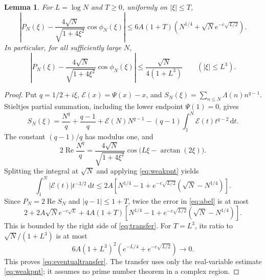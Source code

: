 \documentclass[11pt]{article}
\newtheorem{lemma}[theorem]{Lemma}
\theoremstyle{remark}
\newcommand{\dd}{\,\mathrm d}
\numberwithin{equation}{section}
\begin{document}
\begin{lemma}\label{lem:transfer}
For $L=\log N$ and $T\ge0$, uniformly on $|\xi|\le T$,
\begin{equation}\label{eq:transfer}
 \left|P_N(\xi)-\frac{4\sqrt N}{\sqrt{1+4\xi^2}}
                   \cos\phi_N(\xi)\right|
 \le6A(1+T)\left(N^{1/4}+\sqrt N e^{-c\sqrt{L/2}}\right).
\end{equation}
In particular, for all sufficiently large $N$,
\begin{equation}\label{eq:eventualtransfer}
 \left|P_N(\xi)-\frac{4\sqrt N}{\sqrt{1+4\xi^2}}
                   \cos\phi_N(\xi)\right|
 \le\frac{\sqrt N}{4(1+L^3)}\qquad(|\xi|\le L^3).
\end{equation}
\end{lemma}
\begin{proof}
Put $q=1/2+i\xi$, $\mathcal E(x)=\Psi(x)-x$, and
$S_N(\xi)=\sum_{n\le N}\Lambda(n)n^{q-1}$. Stieltjes partial summation, including the lower endpoint $\Psi(1)=0$, gives
\begin{equation}\label{eq:abel}
 S_N(\xi)=\frac{N^q}{q}+\frac{q-1}{q}
     +\mathcal E(N)N^{q-1}
     -(q-1)\int_1^N\mathcal E(t)t^{q-2}\dd t.
\end{equation}
The constant $(q-1)/q$ has modulus one, and
\[
 2\operatorname{Re}\frac{N^q}{q}
 =\frac{4\sqrt N}{\sqrt{1+4\xi^2}}
       \cos\bigl(L\xi-\arctan(2\xi)\bigr).
\]
Splitting the integral at $\sqrt N$ and applying \eqref{eq:weakpnt} yields
\begin{equation}\label{eq:integralbound}
 \int_1^N|\mathcal E(t)|t^{-3/2}\dd t
 \le2A\left[N^{1/4}-1+
      e^{-c\sqrt{L/2}}(\sqrt N-N^{1/4})\right].
\end{equation}
Since $P_N=2\operatorname{Re}S_N$ and $|q-1|\le1+T$, twice the error in \eqref{eq:abel} is at most
\[
 2+2A\sqrt N e^{-c\sqrt L}
 +4A(1+T)\left[N^{1/4}-1+
      e^{-c\sqrt{L/2}}(\sqrt N-N^{1/4})\right].
\]
This is bounded by the right side of \eqref{eq:transfer}. For $T=L^3$, its ratio to $\sqrt N/(1+L^3)$ is at most
\[
 6A(1+L^3)^2\left(e^{-L/4}+e^{-c\sqrt{L/2}}\right)\longrightarrow0.
\]
This proves \eqref{eq:eventualtransfer}. The transfer uses only the real-variable estimate \eqref{eq:weakpnt}; it assumes no prime number theorem in a complex region.
\end{proof}
\end{document}
